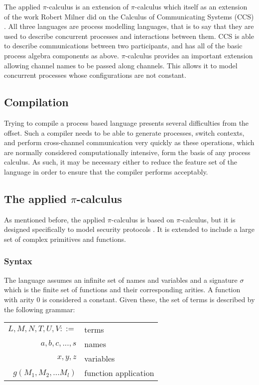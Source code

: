 The applied $\pi$-calculus \cite{af01} is an extension of $\pi$-calculus \cite{mpw92} which itself as an extension of the work Robert Milner did on the Calculus of Communicating Systems (CCS) \cite{m82}. All three languages are process modelling languages, that is to say that they are used to describe concurrent processes and interactions between them. 
CCS is able to describe communications between two participants, and has all of the basic process algebra components as above. 
$\pi$-calculus provides an important extension allowing channel names to be passed along channels. This allows it to model concurrent processes whose configurations are not constant.

\subsection{Compilation}

Trying to compile a process based language presents several difficulties from the offset. Such a compiler needs to be able to generate processes, switch contexts, and perform cross-channel communication very quickly as these operations, which are normally considered computationally intensive, form the basis of any process calculus. \cite{pt97} 
As such, it may be necessary either to reduce the feature set of the language in order to ensure that the compiler performs acceptably. 

\subsection{The applied $\pi$-calculus}

As mentioned before, the applied $\pi$-calculus is based on $\pi$-calculus, but it is designed specifically to model security protocols \cite{rs13}. It is extended to include a large set of complex primitives and functions.
\subsubsection{Syntax}

The language assumes an infinite set of names and variables and a signature $\sigma$ which is the finite set of functions and their corresponding arities\cite{af01}. A function with arity 0 is considered a constant. Given these, the set of terms is described by the following grammar:
\begin{table}[hc!]
    \begin{tabular}{r l}
        $L,M,N,T,U,V ::=$ & terms \\
        $a,b,c,...,s$ & names\\
        $x,y,z$ & variables\\
        $g(M_{1},M_{2},...M_{l})$ & function application \\
    \end{tabular}
\end{table}

